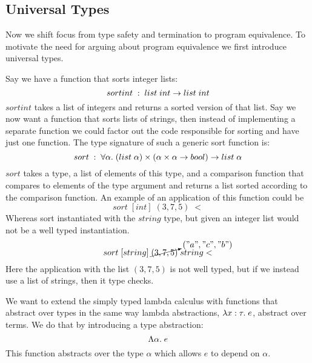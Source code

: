 \subsection*{Universal Types}
Now we shift focus from type safety and termination to program equivalence. To motivate the need for arguing about program equivalence we first introduce universal types.

Say we have a function that sorts integer lists:
\[
  sortint \; : \;  list \; int \rightarrow list \; int
\]
$sortint$ takes a list of integers and returns a sorted version of that list. Say we now want a function that sorts lists of strings, then instead of implementing a separate function we could factor out the code responsible for sorting and have just one function. The type signature of such a generic sort function is:
\[
  sort \; : \; \forall \alpha.\;  (list \; \alpha) \times ( \alpha \times \alpha \rightarrow bool ) \rightarrow list \; \alpha
\]
$sort$ takes a type, a list of elements of this type, and a comparison function that compares to elements of the type argument and returns a list sorted according to the comparison function. An example of an application of this function could be
\[
  sort \; [int] \; (3,7,5) \; <
\]
Whereas sort instantiated with the $string$ type, but given an integer list would not be a well typed instantiation.
\[
  sort \; [string] \; \cancelto{("a","c","b")}{(3,7,5)} \; string<
\]
Here the application with the list $(3,7,5)$ is not well typed, but if we instead use a list of strings, then it type checks. 

We want to extend the simply typed lambda calculus with functions that abstract over types in the same way lambda abstractions, $\lambda x : \tau . \; e$, abstract over terms. We do that by introducing a type abstraction:
\[
  \Lambda \alpha . \; e
\]
This function abstracts over the type $\alpha$ which allows $e$ to depend on $\alpha$.

